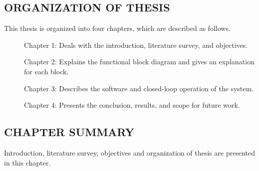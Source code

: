 \subsection{ORGANIZATION OF THESIS}
\hspace{0.2in}This thesis is organized into four chapters, which are described as follows.

\begin{description}
	\item[] Chapter 1: Deals with the introduction, literature survey, and objectives.
	\item[] Chapter 2: Explains the functional block diagram and gives an explanation for each block.
	\item[] Chapter 3: Describes the software and closed-loop operation of the system.
	\item[] Chapter 4: Presents the conclusion, results, and scope for future work.
\end{description}

\subsection{CHAPTER SUMMARY}
\hspace{0.2in} Introduction, literature survey, objectives and organization of thesis are presented in this chapter.

\newpage